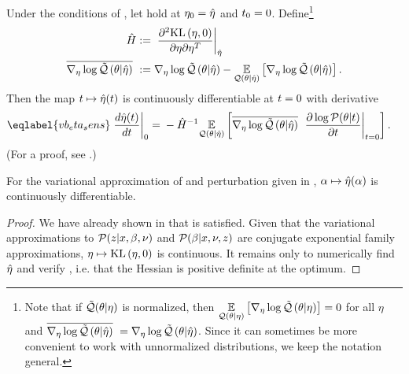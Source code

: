 \begin{thm}
%
Under the conditions of , let  hold at $\eta_0 = \hat\eta$ and $t_0 = 0$.
Define\footnote{Note that if $\tilde{\mathcal{Q}}(\theta \vert \eta)$ is normalized, then
$\underset{\mathcal{Q}(\theta \vert \eta)}{\mathbb{E}}\left[{\nabla_\eta \log \tilde{\mathcal{Q}}}\left(\theta \vert \eta\right)\right] = 0$ for all $\eta$
and $\overline{{\nabla_\eta \log \tilde{\mathcal{Q}}}\left(\theta \vert \hat\eta\right)}\,\, = {\nabla_\eta \log \tilde{\mathcal{Q}}}\left(\theta \vert \hat\eta\right)$.
Since it can sometimes be more convenient to work with unnormalized distributions,
we keep the notation general.}
%
\begin{align*}
%
\hessopt :={}& \fracat{\partial^2 \KL{\eta, 0}}
                {\partial \eta \partial \eta^T}
                {\etaopt} \\
\lqgradbar{\theta \vert \etaopt} :={}&
    \lqgrad{\theta \vert \etaopt} -
    \expect{\q(\theta \vert \etaopt)}{\lqgrad{\theta \vert \etaopt}}.
%
\end{align*}
%
Then the map $t \mapsto \hat\eta(t)$ is continuously differentiable at $t=0$
with derivative
%
\begin{align}\eqlabel{vb_eta_sens}
%
\fracat{d \etaopt(\t)}{d \t}{0} ={}&
    - \hessopt^{-1}
    \expect{\q(\theta \vert \etaopt)}{
        \lqgradbar{\theta \vert \etaopt}
        \fracat{\partial \log \p(\theta \vert \t)}{\partial \t}{\t=0}
    }.
%
\end{align}
%
(For a proof, see  .)
%
\end{thm}


\begin{cor}
%
For the variational approximation of  and perturbation
given in , $\alpha \mapsto \hat\eta(\alpha)$
is continuously differentiable.
%
\begin{proof}
%
We have already shown in  that  is
satisfied.  Given that the variational approximations to $\mathcal{P}(z \vert x, \beta,
\nu)$ and $\mathcal{P}(\beta \vert x, \nu, z)$ are conjugate exponential family
approximations, $\eta \mapsto \mathrm{KL}\left(\eta, 0\right)$ is continuous.  It remains only to
numerically find $\hat\eta$ and verify , i.e.
that the Hessian is positive definite at the optimum.
%
\end{proof}
%
\end{cor}

